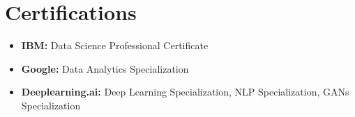 \documentclass[9pt, letterpaper]{article}
\begin{document}
\section{Certifications}
\begin{justify}
    \begin{itemize}[leftmargin=*]
        \item \textbf{IBM:} Data Science Professional Certificate
        \item \textbf{Google:} Data Analytics Specialization
        \item \textbf{Deeplearning.ai:} Deep Learning Specialization, NLP Specialization, GANs Specialization 
    \end{itemize}
\end{justify}
        
\end{document}
